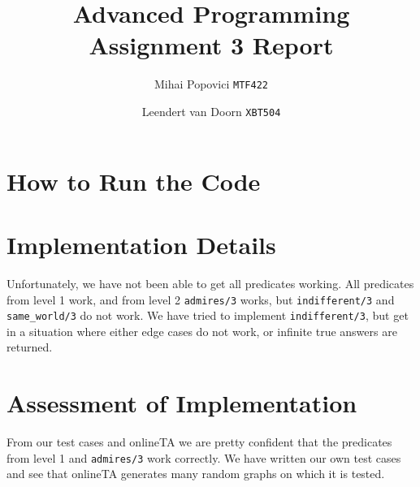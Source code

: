 \documentclass{article}
\title{Advanced Programming Assignment 3 Report}
\author{Mihai Popovici \texttt{MTF422} \and Leendert van Doorn \texttt{XBT504}}
\begin{document}
\maketitle

\section{How to Run the Code}


\section{Implementation Details}
Unfortunately, we have not been able to get all predicates working. All predicates from level 1 work, and from level 2 \texttt{admires/3} works, but \texttt{indifferent/3} and \texttt{same\_world/3} do not work. We have tried to implement \texttt{indifferent/3}, but get in a situation where either edge cases do not work, or infinite true answers are returned. 

\section{Assessment of Implementation}
From our test cases and onlineTA we are pretty confident that the predicates from level 1 and \texttt{admires/3} work correctly. We have written our own test cases and see that onlineTA generates many random graphs on which it is tested.
\end{document}

